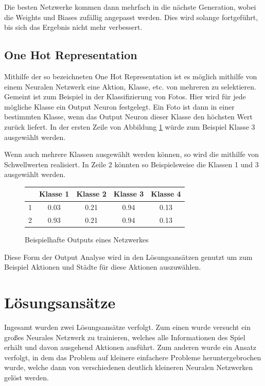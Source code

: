 \documentclass[11pt, twocolumn]{article}
\begin{document}
Die besten Netzwerke kommen dann mehrfach in die nächste Generation, wobei die Weights und Biases zufällig angepasst werden. Dies wird solange fortgeführt, bis sich das Ergebnis nicht mehr verbessert.

\subsection{One Hot Representation}
Mithilfe der so bezeichneten One Hot Representation ist es möglich mithilfe von einem Neuralen Netzwerk eine Aktion, Klasse, etc. von mehreren zu selektieren. Gemeint ist zum Beispiel in der Klassifizierung von Fotos. Hier wird für jede mögliche Klasse ein Output Neuron festgelegt. Ein Foto ist dann in einer bestimmten Klasse, wenn das Output Neuron dieser Klasse den höchsten Wert zurück liefert. In der ersten Zeile von Abbildung \ref{tab:one-hot} würde zum Beispiel Klasse 3 ausgewählt werden.

Wenn auch mehrere Klassen ausgewählt werden können, so wird die mithilfe von Schwellwerten realisiert. In Zeile 2 könnten so Beispielsweise die Klassen 1 und 3 ausgewählt werden.

\begin{figure}[h]
\centering
\begin{tabular}{|r|c|c|c|c|}
	\hline
  	& Klasse 1 & Klasse 2 & Klasse 3 & Klasse 4 \\\hline
  	1 & 0.03 & 0.21 & 0.94 & 0.13 \\\hline
  	2 & 0.93 & 0.21 & 0.94 & 0.13 \\\hline
\end{tabular}
\caption{Beispielhafte Outputs eines Netzwerkes}
\label{tab:one-hot}
\end{figure}

Diese Form der Output Analyse wird in den Lösungsansätzen genutzt um zum Beispiel Aktionen und Städte für diese Aktionen auszuwählen.


\section{Lösungsansätze}
Ingesamt wurden zwei Lösungsansätze verfolgt. Zum einen wurde versucht ein großes Neurales Netzwerk zu trainieren, welches alle Informationen des Spiel erhält und davon ausgehend Aktionen ausführt. Zum anderen wurde ein Ansatz verfolgt, in dem das Problem auf kleinere einfachere Probleme heruntergebrochen wurde, welche dann von verschiedenen deutlich kleineren Neuralen Netzwerken gelöst werden.
\end{document}
